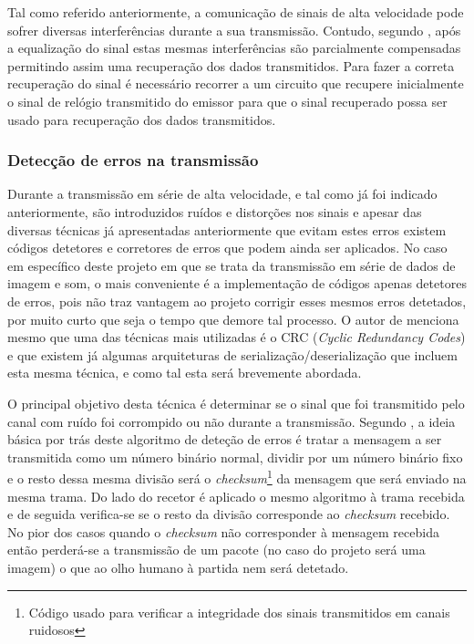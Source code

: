 Tal como referido anteriormente, a comunicação de sinais de alta velocidade pode sofrer diversas interferências durante a sua transmissão. Contudo, segundo \cite{R012}, após a equalização do sinal estas mesmas interferências são parcialmente compensadas permitindo assim uma recuperação dos dados transmitidos.  Para fazer a correta recuperação do sinal é necessário recorrer a um circuito que recupere inicialmente o sinal de relógio transmitido do emissor para que o sinal recuperado possa ser usado para recuperação dos dados transmitidos. 

\subsubsection*{Detecção de erros na transmissão}

Durante a transmissão em série de alta velocidade, e tal como já foi indicado anteriormente, são introduzidos ruídos e distorções nos sinais e apesar das diversas técnicas já apresentadas anteriormente que evitam estes erros existem códigos detetores e corretores de erros que podem ainda ser aplicados.
No caso em específico deste projeto em que se trata da transmissão em série de dados de imagem e som, o mais conveniente é a implementação de códigos apenas detetores de erros, pois não traz vantagem ao projeto corrigir esses mesmos erros detetados, por muito curto que seja o tempo que demore tal processo. O autor de \cite{R012} menciona mesmo que uma das técnicas mais utilizadas é o CRC (\textit{Cyclic Redundancy Codes}) e que existem já algumas arquiteturas de serialização/deserialização que incluem esta mesma técnica, e como tal esta será brevemente abordada. 

O principal objetivo desta técnica é determinar se o sinal que foi transmitido pelo canal com ruído foi corrompido ou não durante a transmissão. Segundo \cite{R028}, a ideia básica por trás deste algoritmo de deteção de erros é tratar a mensagem a ser transmitida como um número binário normal, dividir por um número binário fixo e o resto dessa mesma divisão será o \textit{checksum}\footnote{Código usado para verificar a integridade dos sinais transmitidos em canais ruidosos} da mensagem que será enviado na mesma trama. Do lado do recetor é aplicado o mesmo algoritmo à trama recebida e de seguida verifica-se se o resto da divisão corresponde ao \textit{checksum} recebido. No pior dos casos quando o \textit{checksum} não corresponder à mensagem recebida então perderá-se a transmissão de um pacote (no caso do projeto será uma imagem) o que ao olho humano à partida nem será detetado.

